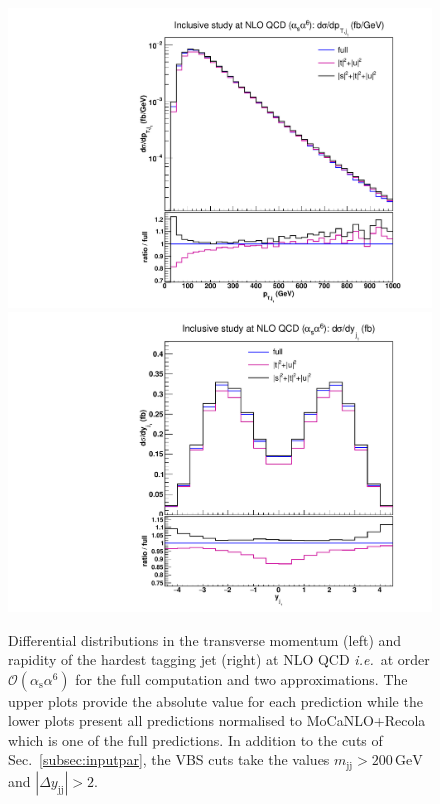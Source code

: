 \documentclass[twocolumn,epjc3]{svjour3} %
\newcommand{\Pj}{\ensuremath{\text{j}}\xspace}
\newcommand{\GeV}{\ensuremath{\,\text{GeV}}\xspace}
\newcommand{\alphas}{\ensuremath{\alpha_\text{s}}\xspace}
\begin{document}
    \begin{figure}[hbt]
    \centering
    {\includegraphics[scale=0.35]{figures/scanfigures/ptj1_nlo.pdf}}
    {\includegraphics[scale=0.35]{figures/scanfigures/yj1_nlo.pdf}}
    \caption{Differential distributions in the transverse momentum (left) and rapidity of the hardest tagging jet (right) at NLO QCD \emph{i.e.}\ at order $\mathcal{O}(\alphas\alpha^6)$ for the full computation and two approximations.
    The upper plots provide the absolute value for each prediction while the lower plots present all predictions normalised to {\sc MoCaNLO}+{\sc Recola} which is one of the full predictions.
    In addition to the cuts of Sec.~\protect\ref{subsec:inputpar}, the VBS cuts take the values $m_{\Pj\Pj}>200 \GeV$ and $|\Delta y_{\Pj\Pj}|>2$.} 
    \label{fig:mjjdyjj_1d_2}
    \end{figure}
\end{document}
